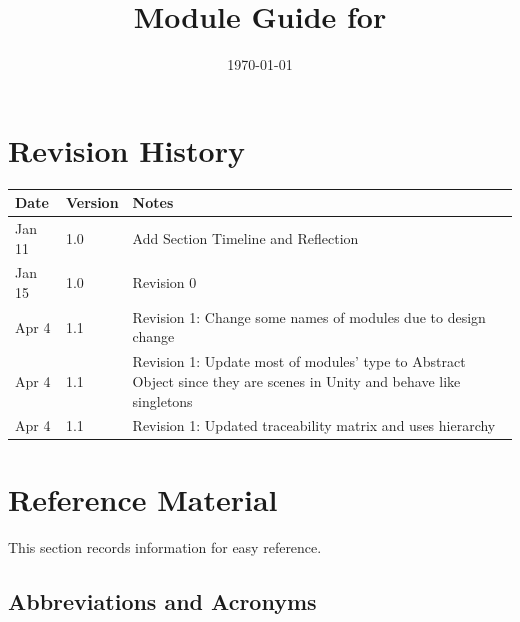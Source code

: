 \documentclass[12pt, titlepage]{article}
\begin{document}
\title{Module Guide for \progname{}} 
\author{\authname}
\date{\today}

\maketitle


\section{Revision History}

\begin{tabularx}{\textwidth}{p{3cm}p{2cm}X}
\toprule {\bf Date} & {\bf Version} & {\bf Notes}\\
\midrule
Jan 11 & 1.0 & Add Section Timeline and Reflection\\
Jan 15 & 1.0 & Revision 0\\
Apr 4 & 1.1 & Revision 1: Change some names of modules due to design change\\
Apr 4 & 1.1 & Revision 1: Update most of modules' type to Abstract Object since they are scenes in Unity and behave like singletons\\
Apr 4 & 1.1 & Revision 1: Updated traceability matrix and uses hierarchy\\
\bottomrule
\end{tabularx}

\newpage

\section{Reference Material}

This section records information for easy reference.

\subsection{Abbreviations and Acronyms}
\end{document}
